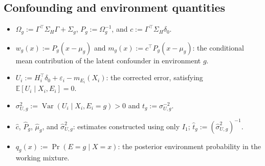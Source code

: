 \documentclass[11pt]{article}
\newcommand{\E}{\mathbb{E}}
\newcommand{\eps}{\varepsilon}
\begin{document}
\subsection*{Confounding and environment quantities}
\begin{itemize}[leftmargin=2em]
  \item $\Omega_g:=\Gamma^\top\Sigma_H\Gamma+\Sigma_g$, $P_g:=\Omega_g^{-1}$, and $c:=\Gamma^\top\Sigma_H\delta_0$.
  \item $w_g(x):=P_g(x-\mu_g)$ and $m_g(x):=c^\top P_g(x-\mu_g)$: the conditional mean contribution of the latent confounder in environment $g$.
  \item $U_i:=H_i^\top\delta_0+\eps_i-m_{E_i}(X_i)$: the corrected error, satisfying $\E[U_i\mid X_i,E_i]=0$.
  \item $\sigma_{U,g}^2:=\operatorname{Var}(U_i\mid X_i,E_i=g)>0$ and $t_g:=\sigma_{U,g}^{-2}$.
  \item $\widehat c$, $\widehat P_g$, $\widehat\mu_g$, and $\widehat\sigma_{U,g}^2$: estimates constructed using only $I_1$; $\widehat t_g:=(\widehat\sigma_{U,g}^2)^{-1}$.
  \item $q_g(x):=\Pr(E=g\mid X=x)$: the posterior environment probability in the working mixture.
\end{itemize}
\end{document}
